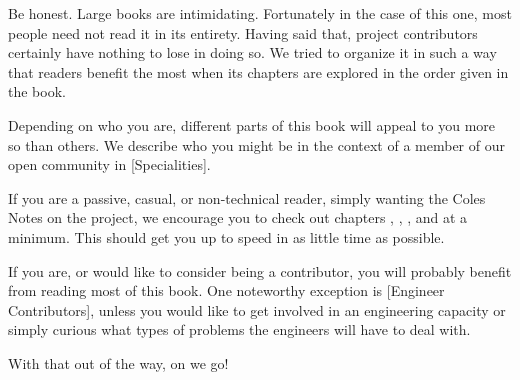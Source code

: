 

Be honest. Large books are intimidating. Fortunately in the case of this one, most people need not read it in its entirety. Having said that, project contributors certainly have nothing to lose in doing so. We tried to organize it in such a way that readers benefit the most when its chapters are explored in the order given in the book.

Depending on who you are, different parts of this book will appeal to you more so than others. We describe who you might be in the context of a member of our open community in [Specialities].

If you are a passive, casual, or non-technical reader, simply wanting the Coles Notes on the project, we encourage you to check out chapters \in[Leitmotifs], , , and \in[Timeline] at a minimum. This should get you up to speed in as little time as possible.

If you are, or would like to consider being a contributor, you will probably benefit from reading most of this book. One noteworthy exception is [Engineer Contributors], unless you would like to get involved in an engineering capacity or simply curious what types of problems the engineers will have to deal with.

With that out of the way, on we go!

\StopChapter

